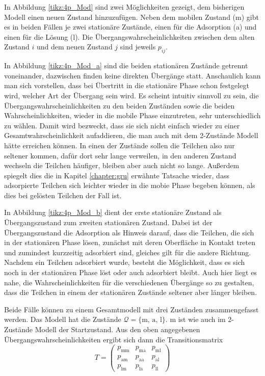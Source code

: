 In Abbildung \ref{tikz:4p_Mod} sind zwei Möglichkeiten gezeigt, dem bisherigen Modell einen neuen Zustand hinzuzufügen.
Neben dem mobilen Zustand (m) gibt es in beiden Fällen je zwei stationäre Zustände, einen für die Adsorption (a) und einen für die Lösung (l). Die Übergangswahrscheinlichkeiten zwischen dem alten Zustand $i$ und dem neuen Zustand $j$ sind jeweils $p_{ij}$. 

In Abbildung \ref{tikz:4p_Mod_a} sind die beiden stationären Zustände getrennt voneinander, dazwischen finden keine direkten Übergänge statt. 
Anschaulich kann man sich vorstellen, dass bei Übertritt in die stationäre Phase schon festgelegt wird, welcher Art der Übergang sein wird. Es scheint intuitiv sinnvoll zu sein, die Übergangswahrscheinlichkeiten zu den beiden Zuständen sowie die beiden Wahrscheinlichkeiten, wieder in die mobile Phase einzutreten, sehr unterschiedlich zu wählen. Damit wird bezweckt, dass sie sich nicht einfach wieder zu einer Gesamtwahrscheinlichkeit aufaddieren, die man auch mit dem 2-Zustände Modell hätte erreichen können. In einen der Zustände sollen die Teilchen also nur seltener kommen, dafür dort sehr lange verweilen,  in den anderen Zustand wechseln die Teilchen häufiger, bleiben aber auch nicht so lange. Außerdem spiegelt dies die in Kapitel \ref{chapter:gru} erwähnte Tatsache wieder, dass adsorpierte Teilchen sich leichter wieder in die mobie Phase begeben können, als dies bei gelösten Teilchen der Fall ist.

In Abbildung \ref{tikz:4p_Mod_b} dient der erste stationäre Zustand als Übergangszustand zum zweiten stationären Zustand. Dabei ist der Übergangszustand die Adsorption als Hinweis darauf, dass die Teilchen, die sich in der stationären Phase lösen, zunächst mit deren Oberfläche in Kontakt treten und zumindest kurzzeitig adsorbiert sind, gleiches gilt für die andere Richtung. Nachdem ein Teilchen adsorbiert wurde, besteht die Möglichkeit, dass es sich noch in der stationären Phase löst oder auch adsorbiert bleibt. Auch hier liegt es nahe, die Wahrscheinlichkeiten für die verschiedenen Übergänge so zu gestalten, dass die Teilchen in einem der stationären Zustände seltener aber länger bleiben.

Beide Fälle können zu einem Gesamtmodell mit drei Zuständen zusammengefasst werden. Das Modell hat die Zustände $\mathcal{Q} = \{\text{m, a, l}\}$. m ist wie auch im 2-Zustände Modell der Startzustand. Aus den oben angegebenen Übergangswahrscheinlichkeiten ergibt sich dann die Transitionsmatrix 
\begin{equation}
T= 
\begin{pmatrix}
p_{\text{mm}} &  p_{\text{ma}} & p_{\text{ml}} \\
p_{\text{am}} &  p_{\text{aa}} & p_{\text{al}} \\
p_{\text{lm}} &  p_{\text{la}} & p_{\text{ll}} 
\end{pmatrix}
\label{3s_Transit}
\end{equation}
  
